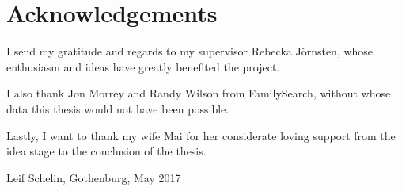\thispagestyle{plain} %
\section*{Acknowledgements}

I send my gratitude and regards to my supervisor Rebecka Jörnsten, whose enthusiasm and ideas have greatly benefited the project.

I also thank Jon Morrey and Randy Wilson from FamilySearch, without whose data this thesis would not have been possible.

Lastly, I want to thank my wife Mai for her considerate loving support from the idea stage to the conclusion of the thesis.

\vspace{1.5cm}
\hfill
Leif Schelin, Gothenburg, May 2017

\newpage
\thispagestyle{empty}
\mbox{}
